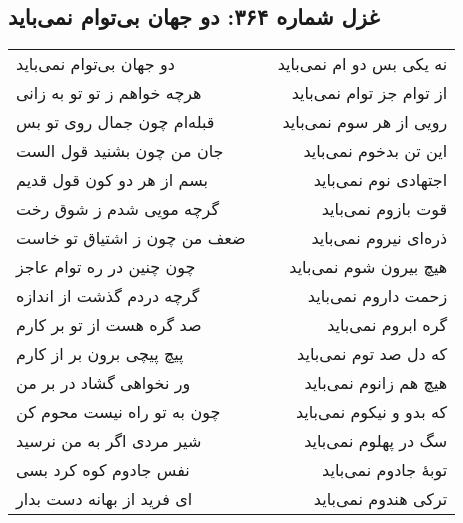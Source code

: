 \begin{center}
\section*{غزل شماره ۳۶۴: دو جهان بی‌توام نمی‌باید}
\label{sec:364}
\begin{longtable}{l p{0.5cm} r}
دو جهان بی‌توام نمی‌باید
&&
نه یکی بس دو ام نمی‌باید
\\
هرچه خواهم ز تو تو به زانی
&&
از توام جز توام نمی‌باید
\\
قبله‌ام چون جمال روی تو بس
&&
رویی از هر سوم نمی‌باید
\\
جان من چون بشنید قول الست
&&
این تن بدخوم نمی‌باید
\\
بسم از هر دو کون قول قدیم
&&
اجتهادی نوم نمی‌باید
\\
گرچه مویی شدم ز شوق رخت
&&
قوت بازوم نمی‌باید
\\
ضعف من چون ز اشتیاق تو خاست
&&
ذره‌ای نیروم نمی‌باید
\\
چون چنین در ره توام عاجز
&&
هیچ بیرون شوم نمی‌باید
\\
گرچه دردم گذشت از اندازه
&&
زحمت داروم نمی‌باید
\\
صد گره هست از تو بر کارم
&&
گره ابروم نمی‌باید
\\
پیچ پیچی برون بر از کارم
&&
که دل صد توم نمی‌باید
\\
ور نخواهی گشاد در بر من
&&
هیچ هم زانوم نمی‌باید
\\
چون به تو راه نیست محوم کن
&&
که بدو و نیکوم نمی‌باید
\\
شیر مردی اگر به من نرسید
&&
سگ در پهلوم نمی‌باید
\\
نفس جادوم کوه کرد بسی
&&
توبهٔ جادوم نمی‌باید
\\
ای فرید از بهانه دست بدار
&&
ترکی هندوم نمی‌باید
\\
\end{longtable}
\end{center}
